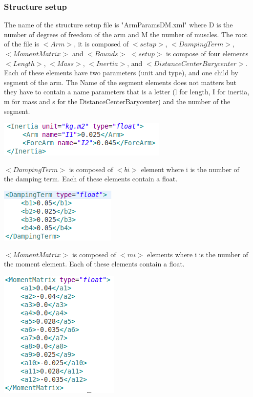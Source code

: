 \documentclass[a4paper]{article}
\begin{document}
\subsubsection{Structure setup}
The name of the structure setup file is "ArmParamsDM.xml" where D is the number of degrees of freedom of the arm and M the number of muscles.
The root of the file is $<Arm>$, it is composed of $<setup>$, $<DampingTerm>$, $<MomentMatrix>$ and $<Bounds>$
$<setup>$ is compose of four elements $<Length>$, $<Mass>$, $<Inertia>$, and $<DistanceCenterBarycenter>$. Each of these elements have two parameters (unit and type), and one child by segment of the arm.
The Name of the segment elements does not matters but they have to contain a name parameters that is a letter (l for length, I for inertia, m for mass and s for the DistanceCenterBarycenter) and the number of the segment.
\begin{flushleft}
\includegraphics[scale=0.5]{XMLInertia.png}
\end{flushleft}

$<DampingTerm>$ is composed of $<bi>$ element where i is the number of the damping term. Each of these elements contain a float.
\begin{flushleft}
\includegraphics[scale=0.5]{XMLDamping.png}
\end{flushleft}

$<MomentMatrix>$ is composed of $<mi>$ elements where i is the number of the moment element. Each of these elements contain a float.
\begin{flushleft}
\includegraphics[scale=0.5]{XMLMoment.png}
\end{flushleft}
\end{document}
